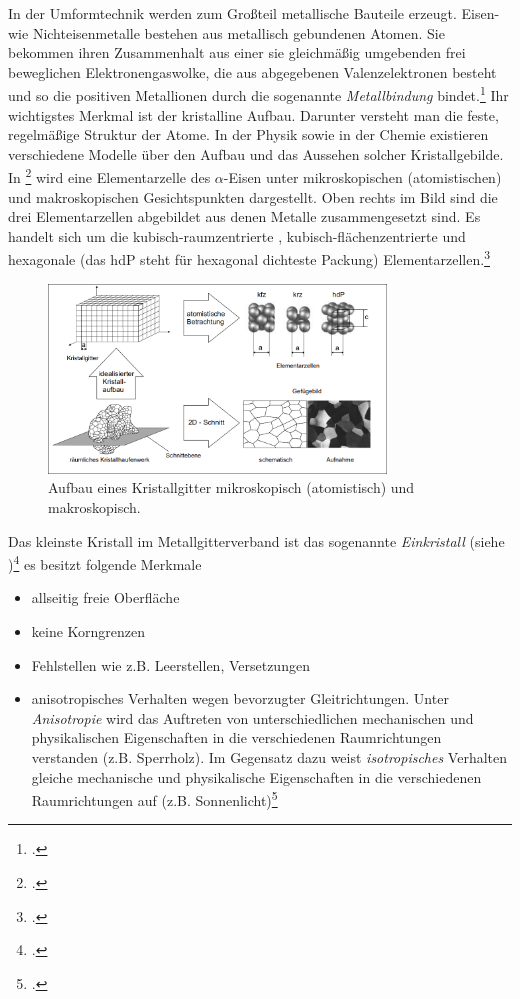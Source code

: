 \documentclass[12pt,a4paper,parskip]{scrartcl}
\begin{document}
{In der Umformtechnik werden zum Großteil metallische Bauteile erzeugt. Eisen- wie Nichteisenmetalle bestehen aus metallisch gebundenen Atomen. Sie bekommen ihren Zusammenhalt aus einer sie gleichmäßig umgebenden frei beweglichen Elektronengaswolke, die aus abgegebenen Valenzelektronen besteht und so die positiven Metallionen  durch die sogenannte \emph{Metallbindung} bindet.\footcite[Vgl.][12]{wki} Ihr wichtigstes Merkmal ist der kristalline Aufbau. Darunter versteht man die feste, regelmäßige Struktur der Atome. In der Physik sowie in der Chemie existieren verschiedene Modelle über den Aufbau und das Aussehen solcher Kristallgebilde. In \footcite[Vgl.][4]{fu} wird eine Elementarzelle des $\alpha $-Eisen unter mikroskopischen (atomistischen) und makroskopischen Gesichtspunkten dargestellt. Oben rechts im Bild sind die drei Elementarzellen abgebildet aus denen Metalle zusammengesetzt sind. Es handelt sich um die  kubisch-raumzentrierte , kubisch-flächenzentrierte und hexagonale (das hdP steht für hexagonal dichteste Packung) Elementarzellen.\footcite[Vgl.][3-5]{fu}
\begin{figure}
\centering
\includegraphics[width=0.8\textwidth]{makromikro}
\caption{Aufbau eines Kristallgitter mikroskopisch (atomistisch) und makroskopisch.}
\label{fig:makromikro}
\end{figure}
Das kleinste Kristall im Metallgitterverband ist das sogenannte \emph{Einkristall} (siehe )\footcite[Vgl.][37]{hu} es besitzt folgende Merkmale\begin{itemize}
\item allseitig freie Oberfläche
\item keine Korngrenzen
\item Fehlstellen wie z.B. Leerstellen, Versetzungen
\item anisotropisches Verhalten wegen bevorzugter Gleitrichtungen. Unter \emph{Anisotropie} wird das Auftreten von unterschiedlichen mechanischen und physikalischen Eigenschaften in die verschiedenen Raumrichtungen verstanden (z.B. Sperrholz). Im Gegensatz dazu weist \emph{isotropisches} Verhalten gleiche mechanische und physikalische Eigenschaften in die verschiedenen Raumrichtungen auf (z.B. Sonnenlicht)\footcite[vgl.][37]{hu}

\end{itemize}}
\end{document}
